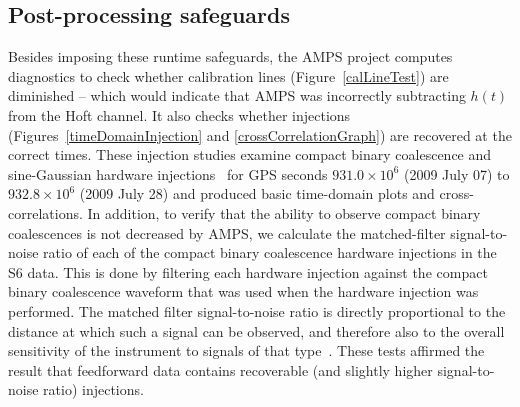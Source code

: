     \subsection{Post-processing safeguards}
    \label{postprocessingSafeguards}

Besides imposing these runtime safeguards, the AMPS project computes diagnostics to check whether calibration lines (Figure~\ref{calLineTest}) are diminished -- which would indicate that AMPS was incorrectly subtracting $h(t)$ from the Hoft channel. It also checks whether injections (Figures~\ref{timeDomainInjection} and \ref{crossCorrelationGraph}) are recovered at the correct times. These injection studies examine compact binary coalescence and sine-Gaussian hardware injections~\cite{LIGOBurst2012} for GPS seconds $931.0 \times 10^6$ (2009 July 07) to $932.8 \times 10^6$ (2009 July 28) and produced basic time-domain plots and cross-correlations. In addition, to verify that the ability to observe compact binary coalescences is not decreased by AMPS, we calculate the matched-filter signal-to-noise ratio of each of the compact binary coalescence hardware injections in the S6 data. This is done by filtering each hardware injection against the compact binary coalescence waveform that was used when the hardware injection was performed. The matched filter signal-to-noise ratio is directly proportional to the distance at which such a signal can be observed, and therefore also to the overall sensitivity of the instrument to signals of that type~\cite{Findchirp2012,PetersMatthews1963}. These tests affirmed the result that feedforward data contains recoverable (and slightly higher signal-to-noise ratio) injections.

